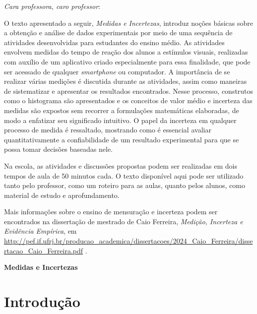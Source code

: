 \documentclass[12pt, a4paper]{article}
\begin{document}
\newpage


\vspace*{2cm}

\noindent \textit{Cara professora, caro professor}: \medskip

O texto apresentado a seguir, \emph{Medidas e Incertezas},  introduz noções básicas sobre a obtenção e análise de dados experimentais por meio de uma sequência de atividades desenvolvidas para estudantes do ensino médio. As atividades envolvem medidas do tempo de reação dos alunos a  estímulos visuais, realizadas com auxílio de um aplicativo criado especialmente para essa finalidade, que pode ser acessado de qualquer \emph{smartphone} ou computador.
A importância de se realizar várias medições é discutida durante as atividades, assim como maneiras de sistematizar e apresentar os resultados encontrados. Nesse processo, construtos como o histograma são apresentados e os conceitos de valor médio e incerteza das medidas são expostos sem recorrer a formulações matemáticas elaboradas, de modo a enfatizar seu significado intuitivo.
O papel da incerteza em qualquer processo de medida é ressaltado, mostrando como é essencial avaliar quantitativamente a confiabilidade de um resultado experimental para que se possa tomar decisões baseadas nele.

Na escola, as atividades e discussões propostas podem ser realizadas em dois tempos de aula de 50 minutos cada. O texto disponível aqui pode ser utilizado tanto pelo professor, como um roteiro para as aulas, quanto pelos alunos, como material de estudo e aprofundamento.

Mais informações sobre o ensino de mensuração e incerteza podem ser encontrados na dissertação de mestrado de Caio Ferreira, \emph{Medição, Incerteza e Evidência Empírica}, em {\small \url{http://pef.if.ufrj.br/producao_academica/dissertacoes/2024_Caio_Ferreira/dissertacao_Caio_Ferreira.pdf} }.

\newpage


\setcounter{page}{1} %
\pagestyle{plain}	     %

\begin{center}
\textbf{\Large Medidas e Incertezas}
\end{center}

\section{Introdução}
\end{document}
